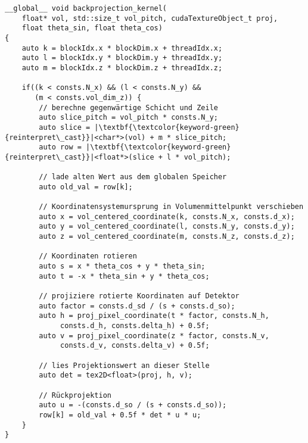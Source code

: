 \begin{code}
\begin{verbatim}
__global__ void backprojection_kernel(
    float* vol, std::size_t vol_pitch, cudaTextureObject_t proj,
    float theta_sin, float theta_cos)
{
    auto k = blockIdx.x * blockDim.x + threadIdx.x;
    auto l = blockIdx.y * blockDim.y + threadIdx.y;
    auto m = blockIdx.z * blockDim.z + threadIdx.z;

    if((k < consts.N_x) && (l < consts.N_y) &&
       (m < consts.vol_dim_z)) {
        // berechne gegenwärtige Schicht und Zeile
        auto slice_pitch = vol_pitch * consts.N_y;
        auto slice = |\textbf{\textcolor{keyword-green}{reinterpret\_cast}}|<char*>(vol) + m * slice_pitch;
        auto row = |\textbf{\textcolor{keyword-green}{reinterpret\_cast}}|<float*>(slice + l * vol_pitch);

        // lade alten Wert aus dem globalen Speicher
        auto old_val = row[k];

        // Koordinatensystemursprung in Volumenmittelpunkt verschieben
        auto x = vol_centered_coordinate(k, consts.N_x, consts.d_x);
        auto y = vol_centered_coordinate(l, consts.N_y, consts.d_y);
        auto z = vol_centered_coordinate(m, consts.N_z, consts.d_z);

        // Koordinaten rotieren
        auto s = x * theta_cos + y * theta_sin;
        auto t = -x * theta_sin + y * theta_cos;

        // projiziere rotierte Koordinaten auf Detektor
        auto factor = consts.d_sd / (s + consts.d_so);
        auto h = proj_pixel_coordinate(t * factor, consts.N_h,
             consts.d_h, consts.delta_h) + 0.5f;
        auto v = proj_pixel_coordinate(z * factor, consts.N_v,
             consts.d_v, consts.delta_v) + 0.5f;

        // lies Projektionswert an dieser Stelle
        auto det = tex2D<float>(proj, h, v);

        // Rückprojektion
        auto u = -(consts.d_so / (s + consts.d_so));
        row[k] = old_val + 0.5f * det * u * u;
    }
}
\end{verbatim}
\label{app:impl_bp}
\end{code}

